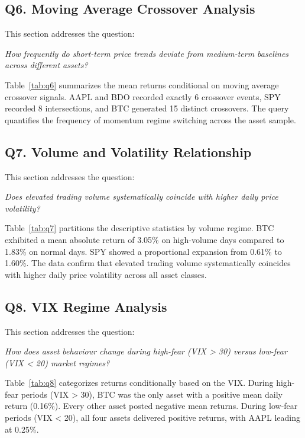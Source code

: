 \subsection{Q6. Moving Average Crossover Analysis}

This section addresses the question:

\noindent\textit{How frequently do short-term price trends deviate from medium-term baselines across different assets?}



Table~\ref{tab:q6} summarizes the mean returns conditional on moving average crossover signals. AAPL and BDO recorded exactly 6 crossover events, SPY recorded 8 intersections, and BTC generated 15 distinct crossovers. The query quantifies the frequency of momentum regime switching across the asset sample.

\subsection{Q7. Volume and Volatility Relationship}

This section addresses the question:

\noindent\textit{Does elevated trading volume systematically coincide with higher daily price volatility?}



Table~\ref{tab:q7} partitions the descriptive statistics by volume regime. BTC exhibited a mean absolute return of 3.05\% on high-volume days compared to 1.83\% on normal days. SPY showed a proportional expansion from 0.61\% to 1.60\%. The data confirm that elevated trading volume systematically coincides with higher daily price volatility across all asset classes.

\subsection{Q8. VIX Regime Analysis}

This section addresses the question:

\noindent\textit{How does asset behaviour change during high-fear (VIX > 30) versus low-fear (VIX < 20) market regimes?}



Table~\ref{tab:q8} categorizes returns conditionally based on the VIX. During high-fear periods (VIX > 30), BTC was the only asset with a positive mean daily return (0.16\%). Every other asset posted negative mean returns. During low-fear periods (VIX < 20), all four assets delivered positive returns, with AAPL leading at 0.25\%.

